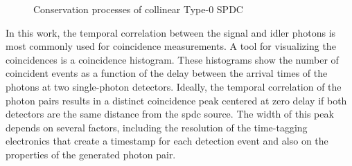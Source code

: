 \begin{figure}[!bt]
{
	}%
	
	\caption{Conservation processes of collinear Type-0 SPDC}
	\label{fig:SPDC}
\end{figure} 
In this work, the temporal correlation between the signal and idler photons is most commonly used for coincidence measurements. A tool for visualizing the coincidences is a coincidence histogram. These histograms show the number of coincident events as a function of the delay between the arrival times of the photons at two single-photon detectors. \newline
Ideally, the temporal correlation of the photon pairs results in a distinct coincidence peak centered at zero delay if both detectors are the same distance from the \acrshort{spdc} source. 
The width of this peak depends on several factors, including the resolution of the time-tagging electronics that create a timestamp for each detection event and also on the properties of the generated photon pair. \newline
